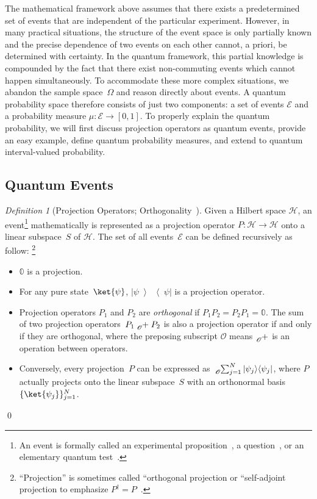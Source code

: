 \documentclass{article}
\theoremstyle{remark}
\newtheorem{definition}{Definition}
\newcommand{\events}{\ensuremath{\mathcal{E}}}
\newcommand{\qevents}{\ensuremath{\mathcal{E}}}
\newcommand{\Hilb}{\mathcal{H}}
\newcommand{\op}[2]{\ensuremath{\left\vert{#1}\middle\rangle\middle\langle{#2}\right\vert}}
\newcommand{\proj}[1]{\op{#1}{#1}}
\begin{document}
The mathematical framework above assumes that there exists a predetermined
set of events that are independent of the particular experiment. However,
in many practical situations, the structure of the event space is
only partially known and the precise dependence of two events on each
other cannot, a priori, be determined with certainty. In the quantum
framework, this partial knowledge is compounded by the fact that there
exist non-commuting events which cannot happen simultaneously. To
accommodate these more complex situations, we abandon the sample space~$\Omega$
and reason directly about events. A quantum probability space therefore
consists of just two components: a set of events $\qevents$ and a
probability measure $\mu:\qevents\rightarrow[0,1]$. To properly explain
the quantum probability, we will first discuss projection operators
as quantum events, provide an easy example, define quantum probability
measures, and extend to quantum interval-valued probability.

\subsection{Quantum Events}

\begin{definition}[Projection Operators; Orthogonality~\cite{10.2307/2308516,Redhead1987-REDINA,peres1995quantum,Griffiths2003,Swart2013}]
\label{def:Projection} Given a Hilbert space $\Hilb$, an event\footnote{An event is formally called an experimental proposition~\cite{BirkhoffVonNeumann1936},
a question~\cite{10.2307/2308516,DBLP:journals/corr/abs-0910-2393},
or an elementary quantum test~\cite{peres1995quantum}.} mathematically is represented as a projection operator $P:\Hilb\rightarrow\Hilb$
onto a linear subspace~$S$ of $\Hilb$. The set of all events~$\events$
can be defined recursively as follow: \footnote{``Projection'' is sometimes called ``orthogonal projection\textquotedbl{}
or ``self-adjoint projection\textquotedbl{} to emphasize $P^{\dagger}=P$~\cite{Griffiths2003,Maassen2010}.} 
\begin{itemize}
\item $\mathbb{0}$ is a projection. 
\item For any pure state~$\ket{\psi}$, $\proj{\psi}$ is a projection
operator. 
\item Projection operators $P_{1}$ and $P_{2}$ are \emph{orthogonal} if
$P_{1}P_{2}=P_{2}P_{1}=\mathbb{0}$. The sum of two projection operators~$P_{1}\tensor*[_{\mathscr{O}}]{+}{}P_{2}$
is also a projection operator if and only if they are orthogonal,
where the preposing subscript $\mathscr{O}$ means $\tensor*[_{\mathscr{O}}]{+}{}$
is an operation between operators. 
\item Conversely, every projection~$P$ can be expressed as $\tensor*[_{\mathscr{O}}]{\sum}{_{j=1}^{N}}\proj{\psi_{j}}$,
where $P$ actually projects onto the linear subspace~$S$ with an
orthonormal basis~$\{\ket{\psi_{j}}\}_{j=1}^{N}$. 
\end{itemize}
\qed\end{definition}
\end{document}
